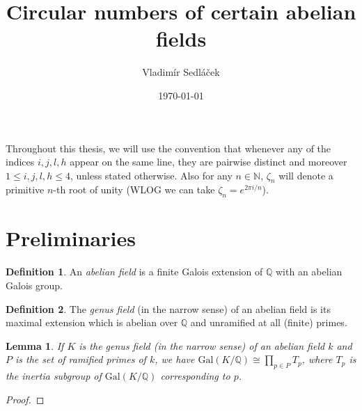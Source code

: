 \documentclass[12pt,a4paper]{article}
\newtheorem{lemma}[theorem]{Lemma}
\theoremstyle{definition}
\newtheorem{definition}{Definition}[section]
\newcommand{\Nbb}{\mathbb{N}}
\newcommand{\Q}{\mathbb{Q}}
\newcommand{\Gal}{\mathrm{Gal}}
\begin{document}
\addtolength{\topmargin}{-30 pt}                   %
\setlength{\headsep}{10 pt}                      %
\renewcommand{\headrulewidth}{1 pt}                %

\title{Circular numbers of certain abelian fields}
\author{Vladimír Sedláček}
\date{\today}
\maketitle

Throughout this thesis, we will use the convention that whenever any of the indices $i,j,l,h$ appear on the same line, they are pairwise distinct and moreover $1\leq i,j,l,h\leq 4$, unless stated otherwise. Also for any $n\in \Nbb$, $\zeta_n$ will denote a primitive $n$-th root of unity (WLOG we can take $\zeta_n=e^{2\pi i/n}$). 

\section{Preliminaries}
\begin{definition}
An \textit{abelian field} is a finite Galois extension of $\Q$ with an abelian Galois group. 
\end{definition}

\begin{definition}
The \textit{genus field} (in the narrow sense) of an abelian field is its maximal extension which is abelian over $\Q$ and unramified at all (finite) primes.
\end{definition}

\begin{lemma}\label{genus}
If $K$ is the genus field (in the narrow sense) of an abelian field $k$ and $P$ is the set of ramified primes of $k$, we have $\Gal(K/\Q)\cong \prod_{p\in P} T_p$, where $T_p$ is the inertia subgroup of $\Gal(K/\Q)$ corresponding to $p$.
\end{lemma}
\begin{proof}
\end{proof}
\end{document}
